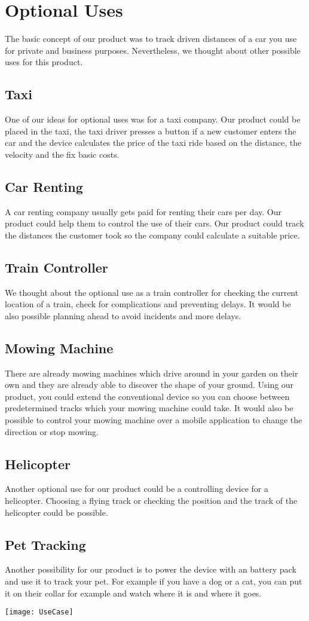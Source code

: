 \chapter{Optional Uses}
The basic concept of our product was to track driven distances of a car you use for private and business purposes. Nevertheless, we thought about other possible uses for this product.
\section{Taxi}
One of our ideas for optional uses was for a taxi company. Our product could be placed in the taxi, the taxi driver presses a button if a new customer enters the car and the device calculates the price of the taxi ride based on the distance, the velocity and the fix basic costs. 
\section{Car Renting}
A car renting company usually gets paid for renting their cars per day. Our product could help them to control the use of their cars. Our product could track the distances the customer took so the company could calculate a suitable price. 
\section{Train Controller}
We thought about the optional use as a train controller for checking the current location of a train, check for complications and preventing delays. It would be also possible planning ahead to avoid incidents and more delays.
\section{Mowing Machine}
There are already mowing machines which drive around in your garden on their own and they are already able to discover the shape of your ground. Using our product, you could extend the conventional device so you can choose between predetermined tracks which your mowing machine could take. It would also be possible to control your mowing machine over a mobile application to change the direction or stop mowing.
\section{Helicopter}
Another optional use for our product could be a controlling device for a helicopter. Choosing a flying track or checking the position and the track of the helicopter could be possible.
\section{Pet Tracking}
Another possibility for our product is to power the device with an battery pack and use it to track your pet. For example if you have a dog or a cat, you can put it on their collar for example and watch where it is and where it goes.
\begin{center}
\texttt{[image: UseCase]}
\end{center}

